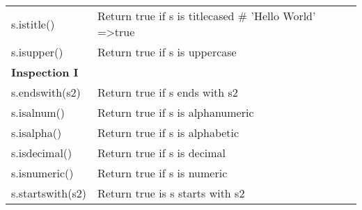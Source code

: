 \documentclass[a4paper,11pt]{book}
\numberwithin{figure}{chapter}
\numberwithin{table}{chapter}
\begin{document}
\begin{appendices}
\begin{table}[!htbp]
\begin{tabular}{lp{12cm}}
s.istitle()              & Return true if s is titlecased \# 'Hello World' =\textgreater true                                                                              \\
s.isupper()              & Return true if s is uppercase                                                                                                                   \\ \midrule
\textbf{Inspection I}             &                                                                                                                                                 \\ \midrule
s.endswith(s2)           & Return true if s ends with s2                                                                                                                   \\
s.isalnum()              & Return true if s is alphanumeric                                                                                                                \\
s.isalpha()              & Return true if s is alphabetic                                                                                                                  \\
s.isdecimal()            & Return true if s is decimal                                                                                                                     \\
s.isnumeric()            & Return true if s is numeric                                                                                                                     \\
s.startswith(s2)         & Return true is s starts with s2                                                                                                                 \\                                                   
\end{tabular}
\end{table}


\end{appendices}
\end{document}
